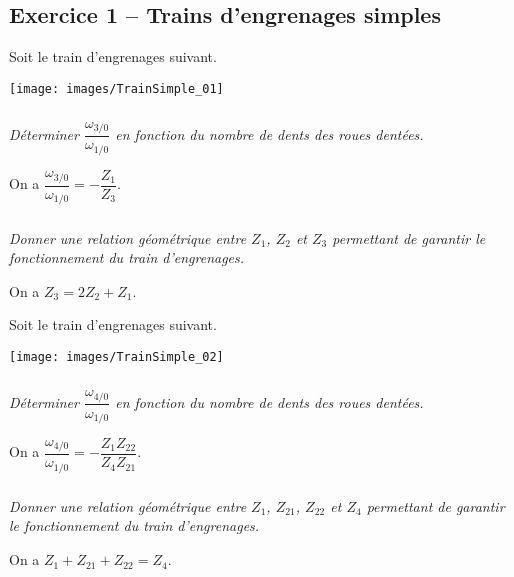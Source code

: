 \documentclass[10pt,fleqn]{article} %
\begin{document}
\def\pathfig{images}

\vspace{4.5cm}
\pagestyle{fancy}
\thispagestyle{plain}

\def\columnseprulecolor{\color{ocre}}
\setlength{\columnseprule}{0.4pt} 

\def\pathfig{images}

\ifprof
\begin{multicols}{2}
\else
\begin{multicols}{2}
\fi


\section*{Exercice 1 -- Trains d'engrenages simples}
\setcounter{exo}{0}

\ifprof
\else
Soit le train d'engrenages suivant. 
\begin{center}
\texttt{[image: images/TrainSimple\_01]}
\end{center}
\fi

\subparagraph{}
\textit{Déterminer $\dfrac{\omega_{3/0}}{\omega_{1/0}}$ en fonction du nombre de dents des roues dentées.}
\ifprof
\begin{corrige}
On a $\dfrac{\omega_{3/0}}{\omega_{1/0}}=-\dfrac{Z_1}{Z_3}$.
\end{corrige}
\else
\fi

\subparagraph{}
\textit{Donner une relation géométrique entre $Z_1$, $Z_2$ et $Z_3$ permettant de garantir le fonctionnement du train d'engrenages. }
\ifprof
\begin{corrige}
On a $Z_3 = 2Z_2 + Z_1$.
\end{corrige}
\else
\fi



\ifprof
\else
Soit le train d'engrenages suivant. 
\begin{center}
\texttt{[image: images/TrainSimple\_02]}
\end{center}
\fi

\subparagraph{}
\textit{Déterminer $\dfrac{\omega_{4/0}}{\omega_{1/0}}$ en fonction du nombre de dents des roues dentées.}
\ifprof
\begin{corrige}
On a $\dfrac{\omega_{4/0}}{\omega_{1/0}}=-\dfrac{Z_1Z_{22}}{Z_4Z_{21}}$.
\end{corrige}
\else
\fi

\subparagraph{}
\textit{Donner une relation géométrique entre $Z_1$, $Z_{21}$, $Z_{22}$ et $Z_4$ permettant de garantir le fonctionnement du train d'engrenages. }
\ifprof
\begin{corrige}
On a $Z_1+Z_{21}+Z_{22}= Z_4$.
\end{corrige}
\else
\fi




\end{multicols}
\end{multicols}
\end{document}
